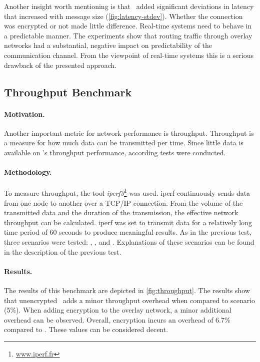 Another insight worth mentioning is that \wnet\ added significant deviations in latency that increased with message size (\cf \autoref{fig:latency-stdev}). Whether the connection was encrypted or not made little difference. Real-time systems need to behave in a predictable manner. The experiments show that routing traffic through overlay networks had a substantial, negative impact on predictability of the communication channel. From the viewpoint of real-time systems this is a serious drawback of the presented approach. 



%
%
%
%
%
%
%
%
%
%

\subsection{Throughput Benchmark} \label{sec:throughput}

\paragraph{Motivation.} Another important metric for network performance is throughput. Throughput is a measure for how much data can be transmitted per time. Since little data is available on \wnet 's throughput performance, according tests were conducted.

\paragraph{Methodology.} To measure throughput, the tool \emph{iperf3}\footnote{\url{www.iperf.fr}} was used. iperf continuously sends data from one node to another over a TCP/IP connection. From the volume of the transmitted data and the duration of the transmission, the effective network throughput can be calculated. iperf was set to transmit data for a relatively long time period of 60 seconds to produce meaningful results. As in the previous test, three scenarios were tested:  , , and . Explanations of these scenarios can be found in the description of the previous test.

\paragraph{Results.} The results of this benchmark are depicted in \autoref{fig:throughput}. The results show that unencrypted \wnet\ adds a minor throughput overhead when compared to  scenario (5\%). When adding encryption to the overlay network, a minor additional overhead can be observed. Overall, encryption incurs an overhead of 6.7\% compared to . These values can be considered decent. 


